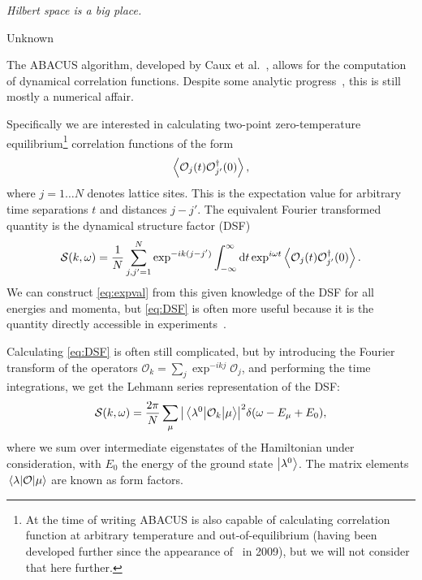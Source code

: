 \documentclass[11pt, a4paper]{report} %
\begin{document}
\epigraph{\textit{Hilbert space is a big place.}}{Unknown}

The ABACUS algorithm, developed by Caux et al.~\cite{Caux2005, Caux2007, Caux2007a, Caux2005a}, allows for the computation of dynamical correlation functions.
Despite some analytic progress~\cite{Nardis2016,Nardis2015,slavnov90_noneq_time_curren_correl_funct}, this is still mostly a numerical affair.

Specifically we are interested in calculating two-point zero-temperature equilibrium\footnote{At the time of writing ABACUS is also capable of calculating correlation function at arbitrary temperature and out-of-equilibrium (having been developed further since the appearance of~\cite{Caux2009} in 2009), but we will not consider that here further.} correlation functions of the form
\begin{equation}\label{eq:expval}
	\expval{\mathcal{O}_j(t)\mathcal{O}_{j'}^{\dagger}(0)},
\end{equation}
where \(j=1\ldots N\) denotes lattice sites.
This is the expectation value for arbitrary time separations $t$ and distances $j-j'$.
The equivalent Fourier transformed quantity is the dynamical structure factor (DSF)
\begin{equation}\label{eq:DSF}
	\mathcal{S}(k,\omega) = \frac{1}{N} \sum_{j,j'=1}^{N} \exp^{-ik(j-j')} \int_{-\infty}^{\infty}\dd t \exp^{i\omega t}\expval{\mathcal{O}_j(t)\mathcal{O}_{j'}^{\dagger}(0)}.
\end{equation}
We can construct \cref{eq:expval} from this given knowledge of the DSF for all energies and momenta, but \cref{eq:DSF} is often more useful because it is the quantity directly accessible in experiments~\cite{Caux2009,Caux2007a}.

Calculating \cref{eq:DSF} is often still complicated, but by introducing the Fourier transform of the operators $\mathcal{O}_k=\sum_j \exp^{-ikj} \mathcal{O}_j$, and performing the time integrations, we get the Lehmann series representation of the DSF:
\begin{equation}
  \label{eq:lehman}
  \mathcal{S}(k,\omega) = \frac{2\pi}{N}\sum_{\mu}\abs{\mel{\lambda^0}{\mathcal{O}_k}{\mu}}^2 \delta(\omega-E_{\mu}+E_0), 
\end{equation}
where we sum over intermediate eigenstates of the Hamiltonian under consideration, with $E_0$ the energy of the ground state $\ket{\lambda^0}$.
The matrix elements $\mel{\lambda}{\mathcal{O}}{\mu}$ are known as form factors.
\end{document}
